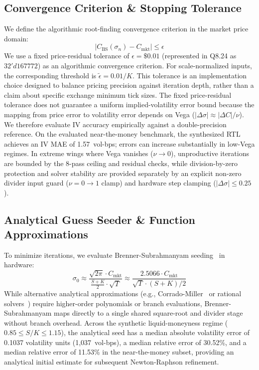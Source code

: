 \documentclass[sigconf,anonymous,review]{acmart}
\begin{document}
\subsection{Convergence Criterion \& Stopping Tolerance}
We define the algorithmic root-finding convergence criterion in the market price domain:
\begin{equation}
    |C_{\text{BS}}(\sigma_n) - C_{\text{mkt}}| \le \epsilon
    \label{eq:convergence_tol}
\end{equation}
We use a fixed price-residual tolerance of $\epsilon = \$0.01$ (represented in Q8.24 as $32'd167772$) as an algorithmic convergence criterion. For scale-normalized inputs, the corresponding threshold is $\tilde{\epsilon} = 0.01 / K$. This tolerance is an implementation choice designed to balance pricing precision against iteration depth, rather than a claim about specific exchange minimum tick sizes. The fixed price-residual tolerance does not guarantee a uniform implied-volatility error bound because the mapping from price error to volatility error depends on Vega ($|\Delta\sigma| \approx |\Delta C| / \nu$). We therefore evaluate IV accuracy empirically against a double-precision reference. On the evaluated near-the-money benchmark, the synthesized RTL achieves an IV MAE of 1.57~vol-bps; errors can increase substantially in low-Vega regimes. In extreme wings where Vega vanishes ($\nu \to 0$), unproductive iterations are bounded by the 8-pass ceiling and residual checks, while division-by-zero protection and solver stability are provided separately by an explicit non-zero divider input guard ($\nu = 0 \to 1$ clamp) and hardware step clamping ($|\Delta\sigma| \le 0.25$).

\subsection{Analytical Guess Seeder \& Function Approximations}
To minimize iterations, we evaluate Brenner-Subrahmanyam seeding~\cite{brenner1988simple} in hardware:
\begin{equation}
    \sigma_0 \approx \frac{\sqrt{2\pi} \cdot C_{\text{mkt}}}{\frac{S + K}{2} \cdot \sqrt{T}} \approx \frac{2.5066 \cdot C_{\text{mkt}}}{\sqrt{T} \cdot (S + K)/2}
    \label{eq:seeder}
\end{equation}
While alternative analytical approximations (e.g., Corrado-Miller~\cite{corrado1996improved} or rational solvers~\cite{jackel2015lets}) require higher-order polynomials or branch evaluations, Brenner-Subrahmanyam maps directly to a single shared square-root and divider stage without branch overhead. Across the synthetic liquid-moneyness regime ($0.85 \le S/K \le 1.15$), the analytical seed has a median absolute volatility error of 0.1037 volatility units (1,037~vol-bps), a median relative error of 30.52\%, and a median relative error of 11.53\% in the near-the-money subset, providing an analytical initial estimate for subsequent Newton-Raphson refinement.
\end{document}
